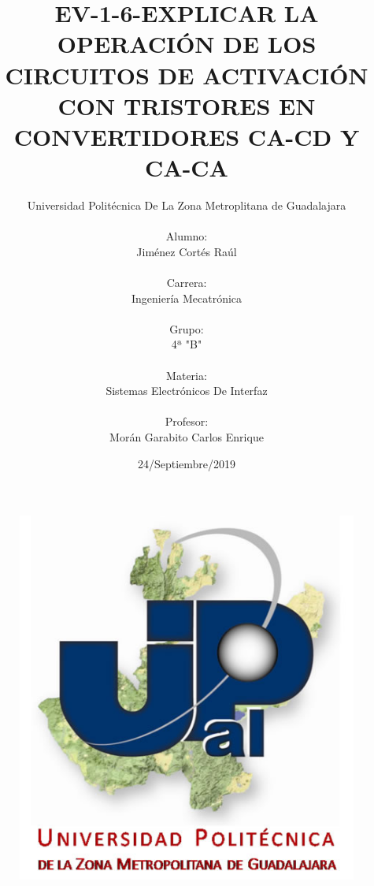 \documentclass[10pt,a4paper]{article}
\author{Universidad Politécnica De La Zona Metroplitana de Guadalajara \\\\ Alumno:\\ Jiménez Cortés Raúl \\\\ Carrera:\\ Ingeniería Mecatrónica\\\\ Grupo:\\ 4ª "B" \\\\
Materia:\\ Sistemas Electrónicos De Interfaz \\\\ Profesor:\\ Morán Garabito Carlos Enrique}
\title{EV-1-6-EXPLICAR LA OPERACIÓN DE LOS CIRCUITOS DE ACTIVACIÓN CON TRISTORES EN CONVERTIDORES CA-CD Y CA-CA}
\date{24/Septiembre/2019}
\begin{document}
\begin{figure}
\centering
\includegraphics[scale=1]{Pa.jpg}
\end{figure}

\maketitle

\newpage
\end{document}
